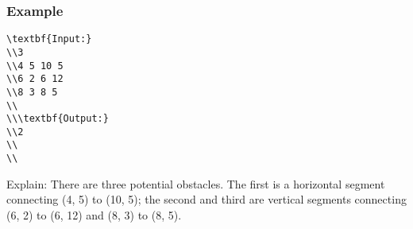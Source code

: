 \subsubsection{   Example  }
\begin{verbatim}
\textbf{Input:}
\\3 
\\4 5 10 5 
\\6 2 6 12 
\\8 3 8 5 
\\
\\\textbf{Output:}
\\2
\\
\\\end{verbatim}

   Explain:       There are three potential obstacles. The first is a horizontal segment connecting (4, 5) to (10, 5); the second and third are vertical segments connecting (6, 2) to (6, 12) and (8, 3) to (8, 5).   